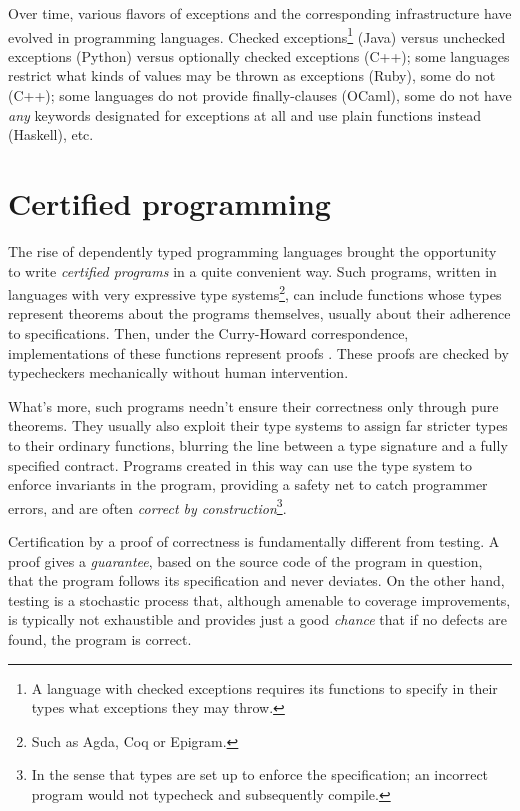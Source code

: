 Over time, various flavors of exceptions and the corresponding infrastructure have evolved
in programming languages. Checked exceptions\footnote{A language with checked exceptions
requires its functions to specify in their types what exceptions they may throw.} (Java)
versus unchecked exceptions (Python) versus optionally checked exceptions (C++); some
languages restrict what kinds of values may be thrown as exceptions (Ruby), some do not (C++);
some languages do not provide finally-clauses (OCaml), some do not have \emph{any}
keywords designated for exceptions at all and use plain functions instead (Haskell), etc.


\section{Certified programming}

The rise of dependently typed programming languages brought the opportunity to write
\emph{certified programs} in a quite convenient way. Such programs, written in languages
with very expressive type systems\footnote{Such as Agda, Coq or Epigram.}, can include
functions whose types represent theorems
about the programs themselves, usually about their adherence to specifications.
Then, under the Curry-Howard correspondence, implementations of these functions
represent proofs \cite{howard80}. These proofs are checked by typecheckers mechanically
without human intervention.

What's more, such programs needn't ensure their correctness only through pure theorems.
They usually also exploit
their type systems to assign far stricter types to their ordinary functions, blurring the line
between a type signature and a fully specified contract. Programs created in this way
can use the type system to enforce invariants in the program, providing a safety net
to catch programmer errors, and are often \emph{correct by construction}\footnote{In the
sense that types are set up to enforce the specification; an incorrect program would
not typecheck and subsequently compile.}.

Certification by a proof of correctness is fundamentally different from testing.
A proof gives a \emph{guarantee}, based on the source code of the program in question,
that the program follows its specification and never deviates. On the other hand, testing
is a stochastic
process that, although amenable to coverage improvements, is typically not exhaustible
and provides just a good \emph{chance} that if no defects are found, the program is correct.

